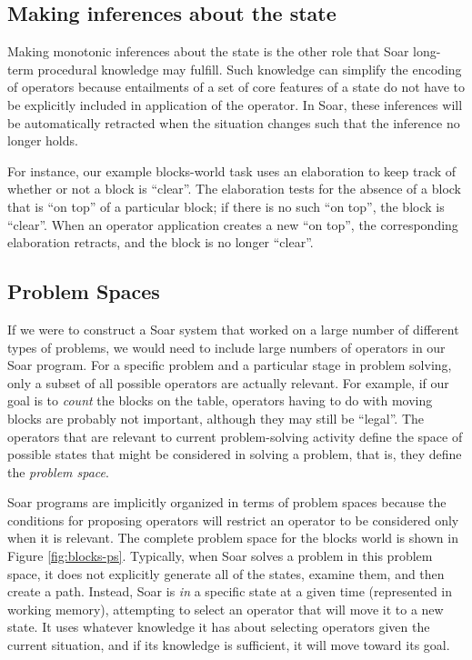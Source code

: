 \subsection{Making inferences about the state}

Making monotonic inferences about the state is the other role that Soar long-term procedural knowledge may fulfill. Such  knowledge can simplify the encoding of operators because entailments of a set of core features of a state do not have to be explicitly included in application of the operator.  In Soar, these inferences will be automatically retracted when the situation changes such that the inference no longer holds.

For instance, our example blocks-world task uses an elaboration to keep track of whether or not a block is ``clear''. The elaboration tests for the absence of a block that is ``on top'' of a particular block; if there is no such ``on top'', the block is ``clear''. When an operator application creates a new ``on top'', the corresponding elaboration retracts, and the block is no longer ``clear''.


\subsection{Problem Spaces}
\label{ARCH-functions-ps}

If we were to construct a Soar system that worked on a large number of different types of problems, we would need to include large numbers of operators in our Soar program. For a specific problem and a particular stage in problem solving, only a subset of all possible operators are actually relevant. For example, if our goal is to \textit{count} the blocks on the table, operators having to do with moving blocks are probably not important, although they may still be ``legal''. The operators that are relevant to current problem-solving activity define the space of possible states that might be considered in solving a problem, that is, they define the \emph{problem space}.

Soar programs are implicitly organized in terms of problem spaces because the conditions for proposing operators will restrict an operator to be considered only when it is relevant.  The complete problem space for the blocks world is shown in Figure \ref{fig:blocks-ps}.  Typically, when Soar solves a problem in this problem space, it does not explicitly generate all of the states, examine them, and then create a path. Instead, Soar is \emph{in} a specific state at a given time (represented in working memory), attempting to select an operator that will move it to a new state.  It uses whatever knowledge it has about selecting operators given the current situation, and if its knowledge is sufficient, it will move toward its goal.

